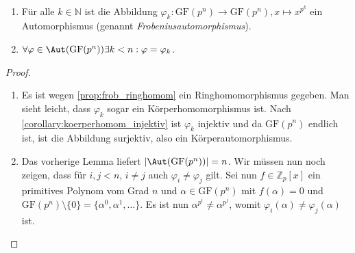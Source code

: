 \begin{theorem}{\ }
    \begin{enumerate}
        \item Für alle $k\in\mathbb{N}$ ist die Abbildung $\varphi_k: \mathrm{GF}(p^n) \to \mathrm{GF}(p^n), x \mapsto x^{p^k}$ ein Automorphismus (genannt \emph{Frobeniusautomorphismus}). 
        \item $\forall \varphi \in \Aut(\mathrm{GF}(p^n)) \exists k < n: \varphi = \varphi_k$.
    \end{enumerate}
\end{theorem}
\begin{proof}{\ }
    \begin{enumerate}
        \item Es ist wegen \cref*{prop:frob_ringhomom} ein Ringhomomorphismus gegeben. Man sieht leicht, dass $\varphi_k$ sogar ein Körperhomomorphismus ist. Nach \cref*{corollary:koerperhomom_injektiv} ist $\varphi_k$ injektiv und da $\mathrm{GF}(p^n)$ endlich ist, ist die Abbildung surjektiv, also ein Körperautomorphismus.
        
        \item Das vorherige Lemma liefert $\vert \Aut(\mathrm{GF}(p^n)) \vert = n$. Wir müssen nun noch zeigen, dass für $i, j < n$, $i \not= j$ auch $\varphi_i \not= \varphi_j$ gilt. Sei nun $f \in \mathbb{Z}_p[x]$ ein primitives Polynom vom Grad $n$ und $\alpha\in\mathrm{GF}(p^n)$ mit $f(\alpha) = 0$ und $\mathrm{GF}(p^n)\setminus\{0\} = \{\alpha^0, \alpha^1, \ldots\}$. Es ist nun $\alpha^{p^i} \not= \alpha^{p^j}$, womit $\varphi_i(\alpha) \not= \varphi_j(\alpha)$ ist.
    \end{enumerate}
\end{proof}

